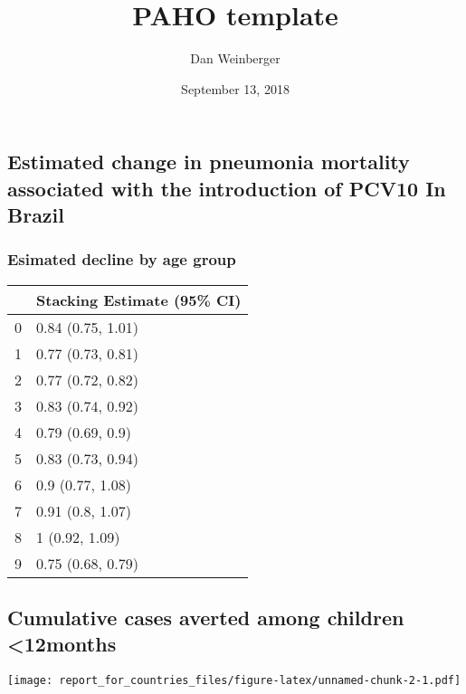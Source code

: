 \documentclass[]{article}
\title{PAHO template}
\author{Dan Weinberger}
\date{September 13, 2018}
\begin{document}
\maketitle

{
\setcounter{tocdepth}{2}
\tableofcontents
}
\subsection{Estimated change in pneumonia mortality associated with the
introduction of PCV10 In
Brazil}\label{estimated-change-in-pneumonia-mortality-associated-with-the-introduction-of-pcv10-in-brazil}

\subsubsection{Esimated decline by age
group}\label{esimated-decline-by-age-group}

\begin{longtable}[]{@{}ll@{}}
\toprule
& Stacking Estimate (95\% CI)\tabularnewline
\midrule
\endhead
0 & 0.84 (0.75, 1.01)\tabularnewline
1 & 0.77 (0.73, 0.81)\tabularnewline
2 & 0.77 (0.72, 0.82)\tabularnewline
3 & 0.83 (0.74, 0.92)\tabularnewline
4 & 0.79 (0.69, 0.9)\tabularnewline
5 & 0.83 (0.73, 0.94)\tabularnewline
6 & 0.9 (0.77, 1.08)\tabularnewline
7 & 0.91 (0.8, 1.07)\tabularnewline
8 & 1 (0.92, 1.09)\tabularnewline
9 & 0.75 (0.68, 0.79)\tabularnewline
\bottomrule
\end{longtable}

\subsection{Cumulative cases averted among children
\textless{}12months}\label{cumulative-cases-averted-among-children-12months}

\texttt{[image: report\_for\_countries\_files/figure-latex/unnamed-chunk-2-1.pdf]}
\end{document}
